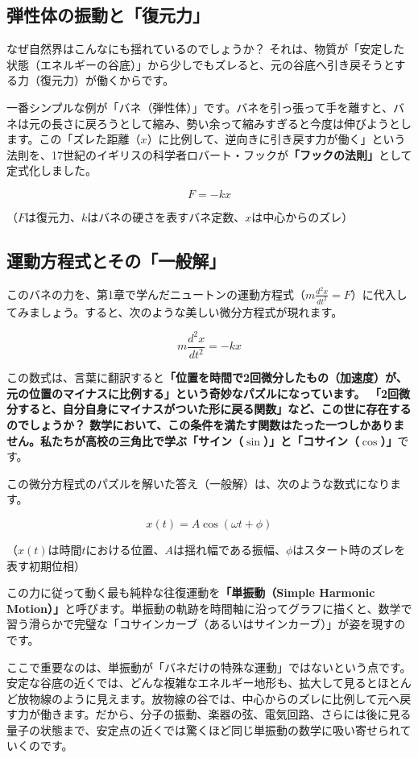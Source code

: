 \subsection{弾性体の振動と「復元力」}

なぜ自然界はこんなにも揺れているのでしょうか？ それは、物質が「安定した状態（エネルギーの谷底）」から少しでもズレると、元の谷底へ引き戻そうとする力（復元力）が働くからです。

一番シンプルな例が「バネ（弾性体）」です。バネを引っ張って手を離すと、バネは元の長さに戻ろうとして縮み、勢い余って縮みすぎると今度は伸びようとします。この「ズレた距離（\(x\)）に比例して、逆向きに引き戻す力が働く」という法則を、17世紀のイギリスの科学者ロバート・フックが\textbf{「フックの法則」}として定式化しました。

\[F = -kx\]

（\(F\)は復元力、\(k\)はバネの硬さを表すバネ定数、\(x\)は中心からのズレ）

\subsection{運動方程式とその「一般解」}

このバネの力を、第1章で学んだニュートンの運動方程式（\(m \frac{d^2x}{dt^2} = F\)）に代入してみましょう。すると、次のような美しい微分方程式が現れます。

\[m \frac{d^2x}{dt^2} = -kx\]

この数式は、言葉に翻訳すると\textbf{「位置を時間で2回微分したもの（加速度）が、元の位置のマイナスに比例する」という奇妙なパズルになっています。 「2回微分すると、自分自身にマイナスがついた形に戻る関数」など、この世に存在するのでしょうか？ 数学において、この条件を満たす関数はたった一つしかありません。私たちが高校の三角比で学ぶ「サイン（\(\sin\)）」と「コサイン（\(\cos\)）」}です。

この微分方程式のパズルを解いた答え（一般解）は、次のような数式になります。

\[x(t) = A \cos(\omega t + \phi)\]

（\(x(t)\)は時間\(t\)における位置、\(A\)は揺れ幅である振幅、\(\phi\)はスタート時のズレを表す初期位相）

この力に従って動く最も純粋な往復運動を\textbf{「単振動（Simple Harmonic Motion）」}と呼びます。単振動の軌跡を時間軸に沿ってグラフに描くと、数学で習う滑らかで完璧な「コサインカーブ（あるいはサインカーブ）」が姿を現すのです。

ここで重要なのは、単振動が「バネだけの特殊な運動」ではないという点です。安定な谷底の近くでは、どんな複雑なエネルギー地形も、拡大して見るとほとんど放物線のように見えます。放物線の谷では、中心からのズレに比例して元へ戻す力が働きます。だから、分子の振動、楽器の弦、電気回路、さらには後に見る量子の状態まで、安定点の近くでは驚くほど同じ単振動の数学に吸い寄せられていくのです。

